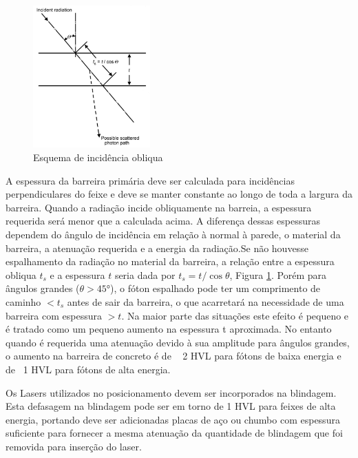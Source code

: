 \documentclass[11pt,a4paper]{article}
\begin{document}
            \begin{figure}
                \centering
                \includegraphics[width=0.4\textwidth]{Imagens/esquemaIncidenciaObliqua.JPG}
                \caption{Esquema de incidência obliqua}
                \label{fig:esquemaIncidenciaObliqua}
            \end{figure}

            A espessura da barreira primária deve ser calculada para incidências perpendiculares do feixe e deve se manter constante ao longo de toda a largura da barreira. Quando a radiação incide obliquamente na barreia, a espessura requerida será menor que a calculada acima. A diferença dessas espessuras dependem do ângulo de incidência em relação à normal à parede, o material da barreira, a atenuação requerida e a energia da radiação.Se não houvesse espalhamento da radiação no material da barreira, a relação entre a espessura obliqua $t_s$ e a espessura $t$ seria dada por $t_s = t/ \cos \theta$, Figura \ref{fig:esquemaIncidenciaObliqua}. Porém para ângulos grandes ($\theta > \ang{45}$), o fóton espalhado  pode ter um comprimento de caminho $< t_s$ antes de sair da barreira, o que acarretará na necessidade de uma barreira com espessura $> t$. Na maior parte das situações este efeito é pequeno e é tratado como um pequeno aumento na espessura t aproximada. No entanto quando é requerida uma atenuação devido à sua amplitude para ângulos grandes, o aumento na barreira de concreto é de ~ 2 HVL para fótons de baixa energia e de ~1 HVL para fótons de alta energia.

            Os Lasers utilizados no posicionamento devem ser incorporados na blindagem. Esta defasagem na blindagem pode ser em torno de 1 HVL para feixes de alta energia, portando deve ser adicionadas placas de aço ou chumbo com espessura suficiente para fornecer a mesma atenuação da quantidade de blindagem que foi removida para inserção do laser.
\end{document}
